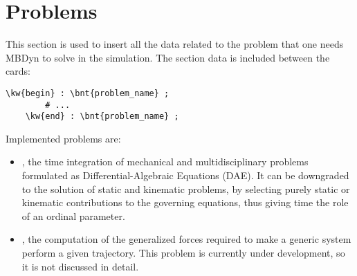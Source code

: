 %
%
%
%
%
% 
%
%

\chapter{Problems}\label{sec:PROBLEMS}
This section is used to insert all the data related to the problem that
one needs MBDyn to solve in the simulation.
The section data is included between the cards:
\begin{Verbatim}[commandchars=\\\{\}]
    \kw{begin} : \bnt{problem_name} ;
        # ...
    \kw{end} : \bnt{problem_name} ;
\end{Verbatim}

Implemented problems are:
\begin{itemize}
\item {}, the time integration of mechanical
and multidisciplinary problems formulated
as Differential-Algebraic Equations (DAE).
It can be downgraded to the solution of static and kinematic problems,
by selecting purely static or kinematic contributions
to the governing equations, thus giving time the role
of an ordinal parameter.

\item {}, the computation of the generalized forces
required to make a generic system perform a given trajectory.
This problem is currently under development, so it is not discussed
in detail.

\end{itemize}





